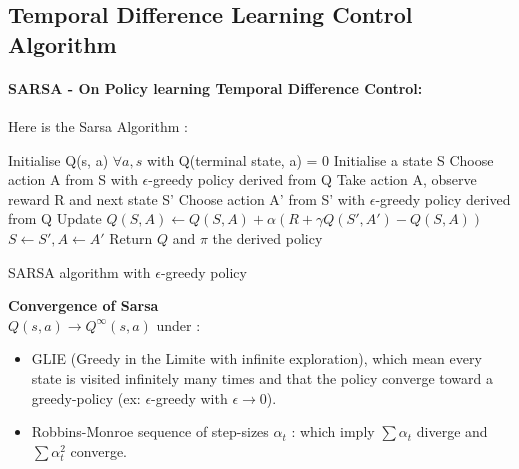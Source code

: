 	\subsection{Temporal Difference Learning Control Algorithm} %
		\label{sub:temporal_difference_learning_control_algorithm}
		
		\paragraph*{SARSA - On Policy learning Temporal Difference Control:}
			Here is the Sarsa Algorithm : \\
			\begin{algorithm}[H]
				Initialise Q(s, a) $\forall a, s$ with Q(terminal state, a) = 0  \;
				{
					Initialise a state S\;
					Choose action A from S with $\epsilon$-greedy policy derived from Q\;
					{
						Take action A, observe reward R and next state S'\;
						Choose action A' from S' with $\epsilon$-greedy policy derived from Q\;
						Update $Q(S, A) \leftarrow Q(S, A) + \alpha (R + \gamma Q(S', A')- Q(S, A))$\;
						$S \leftarrow S', A \leftarrow A'$
					}
				}
				Return $Q$ and $\pi$ the derived policy
				\caption{SARSA algorithm with $\epsilon$-greedy policy}
			\end{algorithm}

			\begin{theorem}
				\textbf{Convergence of Sarsa} \\
				$Q(s, a) \rightarrow Q^\infty(s,a)$ under :
				\begin{itemize}
					\item GLIE (Greedy in the Limite with infinite exploration), which mean every state is visited infinitely many times and that the policy converge toward a greedy-policy (ex: $\epsilon$-greedy with $\epsilon\rightarrow 0$).
					\item Robbins-Monroe sequence of step-sizes $\alpha_t$ : which imply $\sum \alpha_t$ diverge and $\sum \alpha_t^2$ converge.
				\end{itemize}
			\end{theorem}

